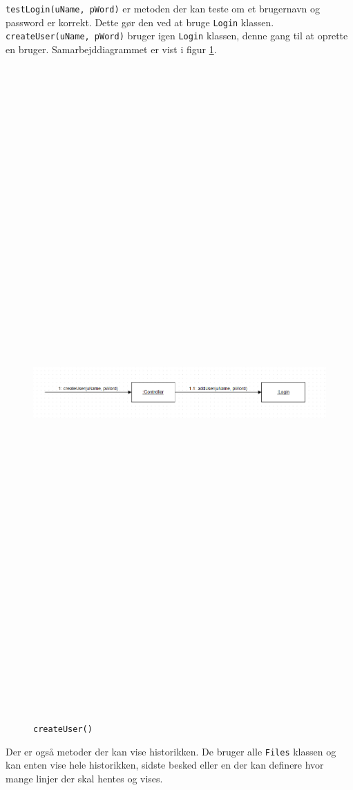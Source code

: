 \newline
\texttt{testLogin(uName, pWord)} er metoden der kan teste om et brugernavn og password er korrekt. Dette gør den ved at bruge \texttt{Login} klassen.
\newline
\texttt{createUser(uName, pWord)} bruger igen \texttt{Login} klassen, denne gang til at oprette en bruger. Samarbejddiagrammet er vist i figur \ref{fig:createu}.
\begin{figure}[ht]
	\centering
	\includegraphics[width=15cm,height=25cm,keepaspectratio]{pictures/SDcreateUser.png}
	\caption{\texttt{createUser()}}
	\label{fig:createu}
\end{figure}
\hfill \break

Der er også metoder der kan vise historikken. De bruger alle \texttt{Files} klassen og kan enten vise hele historikken, sidste besked eller en der kan definere hvor mange linjer der skal hentes og vises.
